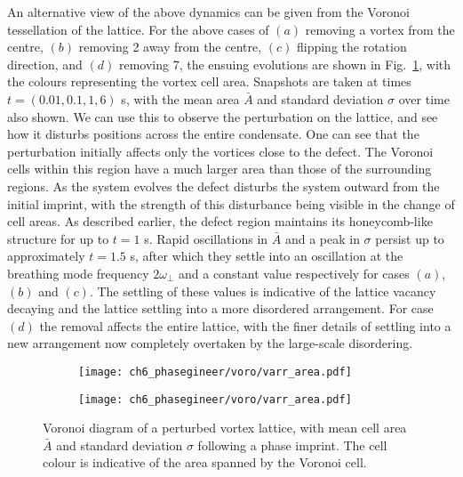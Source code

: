 An alternative view of the above dynamics can be given from the Voronoi tessellation of the lattice. For the above cases of $(a)$ removing a vortex from the centre, $(b)$ removing 2 away from the centre, $(c)$ flipping the rotation direction, and $(d)$ removing 7, the ensuing evolutions are shown in Fig.~\ref{fig:voronoisarea}, with the colours representing the vortex cell area. Snapshots are taken at times $t=(0.01,0.1,1,6)$ s, with the mean area $\bar{A}$ and standard deviation $\sigma$ over time also shown. We can use this to observe the perturbation on the lattice, and see how it disturbs positions across the entire condensate. One can see that the perturbation initially affects only the vortices close to the defect. The Voronoi cells within this region have a much larger area than those of the surrounding regions. As the system evolves the defect disturbs the system outward from the initial imprint, with the strength of this disturbance being visible in the change of cell areas. As described earlier, the defect region maintains its honeycomb-like structure for up to $t=1$ s. Rapid oscillations in $\bar{A}$ and a peak in $\sigma$ persist up to approximately $t=1.5$ s, after which they settle into an oscillation at the breathing mode frequency $2\omega_\perp$ and a constant value respectively for cases $(a)$, $(b)$ and $(c)$. The settling of these values is indicative of the lattice vacancy decaying and the lattice settling into a more disordered arrangement. For case $(d)$ the removal affects the entire lattice, with the finer details of settling into a new arrangement now completely overtaken by the large-scale disordering.

\begin{figure}\centering
    \begin{subfigure}{0.6\textwidth}
        \texttt{[image: ch6\_phasegineer/voro/varr\_area.pdf]}
    \end{subfigure}
    \begin{subfigure}{0.6\textwidth}
        \texttt{[image: ch6\_phasegineer/voro/varr\_area.pdf]}
    \end{subfigure}
    \caption{Voronoi diagram of a perturbed vortex lattice, with mean cell area $\bar{A}$ and standard deviation $\sigma$ following a phase imprint. The cell colour is indicative of the area spanned by the Voronoi cell.}\label{fig:voronoisarea}
\end{figure}


